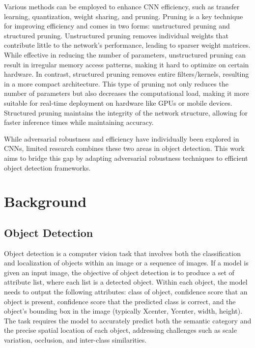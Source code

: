 \documentclass[journal,onecolumn,12pt]{IEEEtran}
\begin{document}

Various methods can be employed to enhance CNN efficiency, such as transfer learning, quantization, weight sharing, and pruning. Pruning is a key technique for improving efficiency and comes in two forms: unstructured pruning and structured pruning. Unstructured pruning removes individual weights that contribute little to the network's performance, leading to sparser weight matrices. While effective in reducing the number of parameters, unstructured pruning can result in irregular memory access patterns, making it hard to optimize on certain hardware. In contrast, structured pruning removes entire filters/kernels, resulting in a more compact architecture. This type of pruning not only reduces the number of parameters but also decreases the computational load, making it more suitable for real-time deployment on hardware like GPUs or mobile devices. Structured pruning maintains the integrity of the network structure, allowing for faster inference times while maintaining accuracy. 

While adversarial robustness and efficiency have individually been explored in CNNs, limited research combines these two areas in object detection. This work aims to bridge this gap by adapting adversarial robustness techniques to efficient object detection frameworks.

\section{Background}
\subsection{Object Detection}

Object detection is a computer vision task that involves both the classification and localization of objects within an image or a sequence of images. If a model is given an input image, the objective of object detection is to produce a set of attribute list, where each list is a detected object. Within each object, the model needs to output the following attributes: class of object, confidence score that an object is present, confidence score that the predicted class is correct, and the object's bounding box in the image (typically Xcenter, Ycenter, width, height). The task requires the model to accurately predict both the semantic category and the precise spatial location of each object, addressing challenges such as scale variation, occlusion, and inter-class similarities.
\end{document}

